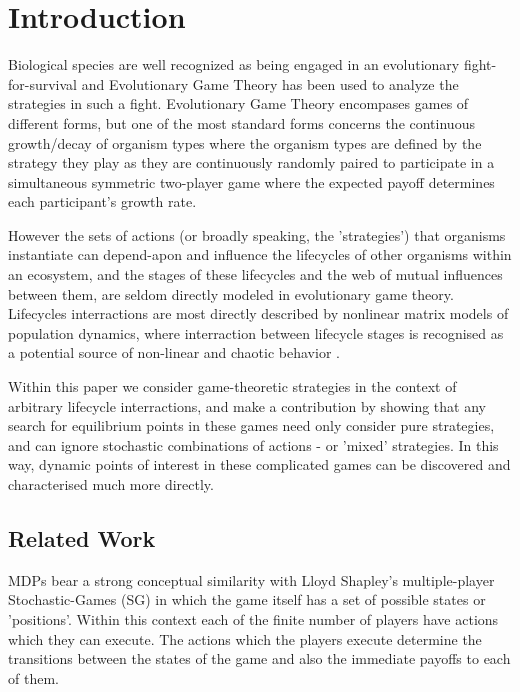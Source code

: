 
\section{Introduction}
Biological species are well recognized as being engaged in an evolutionary fight-for-survival and Evolutionary Game Theory has been used to analyze the strategies in such a fight.
Evolutionary Game Theory encompases games of different forms, but one of the most standard forms concerns the continuous growth/decay of organism types where the organism types are defined by the strategy they play as they are continuously randomly paired to participate in a simultaneous symmetric two-player game where the expected payoff determines each participant's growth rate.\cite{maynard,maynard2}

However the sets of actions (or broadly speaking, the 'strategies') that organisms instantiate can depend-apon and influence the lifecycles of other organisms within an ecosystem, and the stages of these lifecycles and the web of mutual influences between them, are seldom directly modeled in evolutionary game theory.
Lifecycles interractions are most directly described by nonlinear matrix models of population dynamics, where interraction between lifecycle stages is recognised as a potential source of non-linear and chaotic behavior \cite{doi:10.1080/10236198.2019.1699916}\cite[Chapter 16,17]{population1}.

Within this paper we consider game-theoretic strategies in the context of arbitrary lifecycle interractions, and make a contribution by showing that any search for equilibrium points in these games need only consider pure strategies, and can ignore stochastic combinations of actions - or 'mixed' strategies.
In this way, dynamic points of interest in these complicated games can be discovered and characterised much more directly.


\subsection{Related Work}\label{sec:-1}


MDPs bear a strong conceptual similarity with Lloyd Shapley's multiple-player Stochastic-Games (SG) \cite{shapley53}\cite{Solan2015} in which the game itself has a set of possible states or 'positions'. Within this context each of the finite number of players have actions which they can execute. The actions which the players execute determine the transitions between the states of the game and also the immediate payoffs to each of them.

